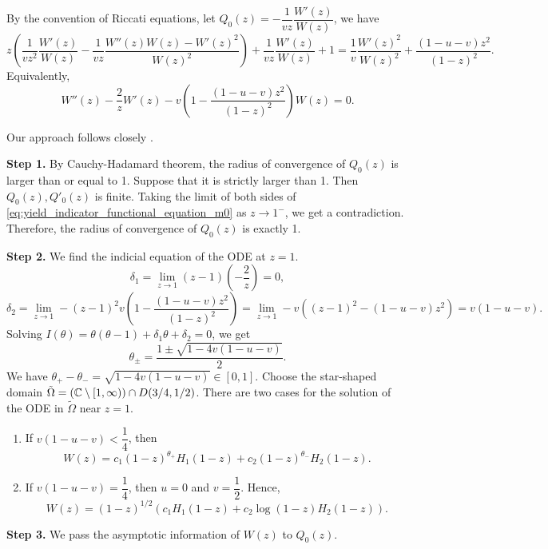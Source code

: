 By the convention of Riccati equations, let $Q_0(z) = -\dfrac{1}{v z}\dfrac{W'(z)}{W(z)}$, we have
$$z\left(\dfrac{1}{vz^2}\dfrac{W'(z)}{W(z)}-\dfrac{1}{vz}\dfrac{W''(z)W(z)-W'(z)^2}{W(z)^2}\right) + \dfrac{1}{v z}\dfrac{W'(z)}{W(z)} + 1 = \dfrac{1}{v}\dfrac{W'(z)^2}{W(z)^2} + \frac{(1-u-v)z^2}{(1-z)^2}.$$
Equivalently,
\begin{equation}
  \label{eq:W_ODE}
  W''(z) - \dfrac{2}{z} W'(z) - v\left(1 - \frac{(1-u-v)z^2}{(1-z)^2}\right) W(z) = 0.
\end{equation}

Our approach follows closely \cite{koechlin2024effects}.

\textbf{Step 1.} By Cauchy-Hadamard theorem, the radius of convergence of $Q_0(z)$ is larger than or equal to 1. Suppose that it is strictly larger than 1. Then $Q_0(z), Q'_0(z)$ is finite. Taking the limit of both sides of \eqref{eq:yield_indicator_functional_equation_m0} as $z\to 1^-$, we get a contradiction. Therefore, the radius of convergence of $Q_0(z)$ is exactly 1.

\textbf{Step 2.} We find the indicial equation of the ODE at $z=1$.
$$\delta_1 = \lim_{z\to 1} (z-1) \left(-\dfrac{2}{z}\right) = 0,$$
$$\delta_2 = \lim_{z\to 1} -(z-1)^2 v\left(1-\frac{(1-u-v)z^2}{(1-z)^2}\right) = \lim_{z\to 1} -v\left((z-1)^2 -(1-u-v)z^2\right) = v(1-u-v).$$
Solving $I(\theta) = \theta(\theta-1) + \delta_1\theta + \delta_2 = 0$, we get
$$\theta_{\pm} = \frac{1 \pm \sqrt{1-4v(1-u-v)}}{2}.$$
We have $\theta_+ - \theta_- = \sqrt{1-4v(1-u-v)}\in [0,1]$. Choose the star-shaped domain $\tilde{\Omega} = ({\mathbb{C}} \setminus [1, \infty)) \cap D(3/4,1/2)$. There are two cases for the solution of the ODE in $\tilde{\Omega}$ near $z=1$.
\begin{enumerate}
  \item If $v(1-u-v) < \dfrac{1}{4}$, then
        $$W(z) = c_1(1-z)^{\theta_+}H_1(1-z) + c_2(1-z)^{\theta_-}H_2(1-z).$$
  \item If $v(1-u-v) = \dfrac{1}{4}$, then $u=0$ and $v=\dfrac{1}{2}$. Hence,
        $$W(z) = (1-z)^{1/2}\left(c_1H_1(1-z) + c_2\log(1-z)H_2(1-z)\right).$$
\end{enumerate}

\textbf{Step 3.} We pass the asymptotic information of $W(z)$ to $Q_0(z)$.